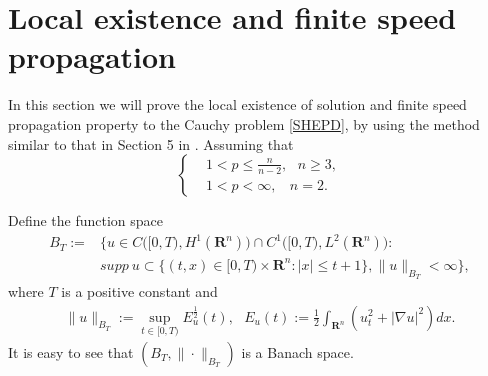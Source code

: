 \documentclass[review]{elsarticle}
\newcommand{\R}{\mathbf{R}}
\begin{document}
\section{Local existence and finite speed propagation}
In this section we will prove the local existence of solution and finite speed propagation property to the Cauchy problem \eqref{SHEPD}, by using the method similar to that in Section 5 in \cite{LST}. Assuming that
\begin{equation}
\label{p}
\left\{
\begin{aligned}
& 1<p\leq\frac{n}{n-2},~~~n\ge 3,\\
& 1<p<\infty,~~~~n=2.
\end{aligned}
\right.
\end{equation}


Define the function space
\begin{equation}\label{btk}
\begin{aligned}
B_{T}:=&\Big\{u\in C\big([0,T),H^1(\R^n)\big)\cap C^1\big([0,T),L^2(\R^n)\big):\\
& supp~u\subset \big\{(t, x)\in[0, T)\times\R^n:|x|\leq t+1\big\},\|u\|_{B_{T}}<\infty\},
\end{aligned}
\end{equation}
where $T$ is a positive constant and
\begin{equation}\label{phibtk}
\begin{aligned}
\|u\|_{B_{T}}:= \mathop{sup}\limits_{t\in[0,T)}E_u^{\frac{1}{2}}(t),~~~E_u(t):=\frac{1}{2}\int_{\R^n}(u_t^2+|\nabla u|^2)dx.
\end{aligned}
\end{equation}
It is easy to see that $(B_{T},\|\cdot\|_{B_T})$ is a Banach space.
\end{document}
